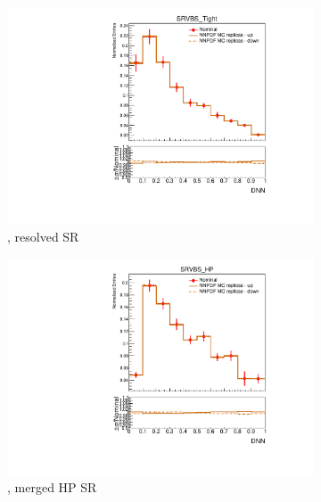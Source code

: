 \begin{figure}[ht]
\begin{subfigure}[b]{0.3\textwidth}
        \includegraphics[width=\textwidth]{figures/1lep/PDFUnc/NNPDF/Z_0ptag2pjet_0ptv_SRVBS_Tight_DNN_SysTheoryPDF_NNPDF_Z__1up_Norm.pdf}
        \caption{\Zjets, resolved SR}
    \end{subfigure}
    \begin{subfigure}[b]{0.3\textwidth}
        \includegraphics[width=\textwidth]{figures/1lep/PDFUnc/NNPDF/Z_0ptag1pfat0pjet_0ptv_SRVBS_HP_DNN_SysTheoryPDF_NNPDF_Z__1up_Norm.pdf}
        \caption{\Zjets, merged HP SR}
    \end{subfigure}
    \begin{subfigure}[b]{0.3\textwidth}

\end{subfigure}
\end{figure}
